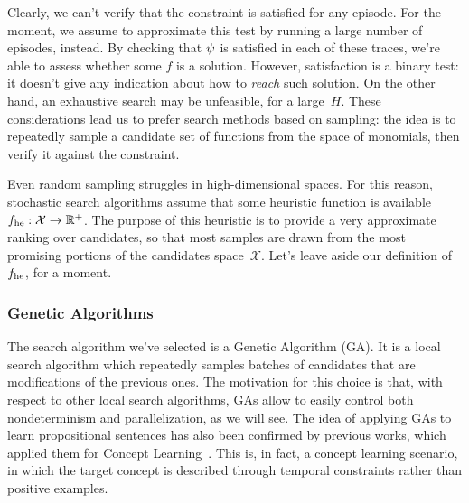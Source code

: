 Clearly, we can't verify that the constraint is satisfied for any episode. For
the moment, we assume to approximate this test by running a large number of
episodes, instead. By checking that $\psi$ is satisfied in each of
these traces, we're able to assess whether some $f$ is a solution. However,
satisfaction is a binary test: it doesn't give any indication about how to
\emph{reach} such solution. On the other hand, an exhaustive search may be
unfeasible, for a large~$H$.  These considerations lead us to prefer search
methods based on sampling: the idea is to repeatedly sample a candidate set of
functions from the space of monomials, then verify it against the constraint.

Even random sampling struggles in high-dimensional spaces. For this reason,
stochastic search algorithms assume that some heuristic function is available
${f_{\text{he}}: \mathcal{X} \to \mathbb{R}^+}$. The purpose of this heuristic is to
provide a very approximate ranking over candidates, so that most samples are
drawn from the most promising portions of the candidates space~$\mathcal{X}$.
Let's leave aside our definition of $f_{\text{he}}$, for a moment.


\subsubsection{Genetic Algorithms}

The search algorithm we've selected is a Genetic Algorithm
(GA). It is a local search algorithm which
repeatedly samples batches of candidates that are modifications of the
previous ones. The motivation for this choice is that, with respect to other
local search algorithms, GAs allow to easily control both nondeterminism and
parallelization, as we will see. The idea of applying GAs to learn
propositional sentences has also been confirmed by previous works, which
applied them for Concept Learning~\cite{bib:ga-for-concepts}. This is, in
fact, a concept learning scenario, in which the target concept is described
through temporal constraints rather than positive examples.

